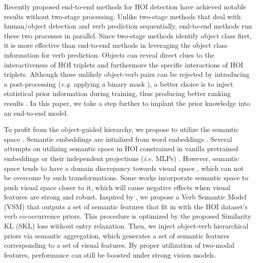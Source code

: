 \documentclass[letterpaper]{article} \usepackage{aaai22}  \usepackage{times}  \usepackage{helvet}  \usepackage{courier}  \usepackage[hyphens]{url}  \usepackage{graphicx} \urlstyle{rm} \def\UrlFont{\rm}  \usepackage{natbib}  \usepackage{caption} \DeclareCaptionStyle{ruled}{labelfont=normalfont,labelsep=colon,strut=off} \frenchspacing  \setlength{\pdfpagewidth}{8.5in}  \setlength{\pdfpageheight}{11in}  \usepackage{algorithm}
\begin{document}
Recently proposed end-to-end methods \cite{liao2020ppdm,kim2021hotr,tamura2021qpic} for HOI detection have achieved notable results without two-stage processing. Unlike two-stage methods that deal with human/object detection and verb prediction sequentially, end-to-end methods run these two processes in parallel. Since two-stage methods identify object class first, it is more effective than end-to-end methods in leveraging the object class information for verb prediction. Objects can reveal direct clues to the interactiveness of HOI triplets \cite{li2019interactiveness} and furthermore the specific interactions of HOI triplets. Although those unlikely object-verb pairs can be rejected by introducing a post-processing (\textit{e.g.} applying a binary mask \cite{tamura2021qpic}), a better choice is to inject statistical prior information during training, thus producing better ranking results \cite{chen2019KERN}. In this paper, we take a step further to implant the prior knowledge into an end-to-end model.












To profit from the object-guided hierarchy, we propose to utilize the semantic space \cite{rahman2020anyshot,xu2019HOIwithknowledge}. Semantic embeddings are intialized from word embeddings \cite{pennington2014glove,mikolov2013word2vec}. Several attempts on utilizing semantic space in HOI constrained in vanilla pretrained embeddings or their independent projections (\textit{i.e.} MLPs) \cite{zhong2020polysemy,gao2020DRG,bansal2020functionalgeneralization,peyre2019HOIwithanalogy}. However, semantic space tends to have a domain discrepancy towards visual space \cite{zhu2021semanticrelation}, which can not be overcome by such transformations. Some works \cite{xu2019HOIwithknowledge,peyre2019HOIwithanalogy} incorporate semantic space to push visual space closer to it, which will cause negative effects when visual features are strong and robust. Inspired by \cite{wu2018nonparametric_instance,you2020multilabelMSE}, we propose a Verb Semantic Model (VSM) that outputs a set of semantic features that fit in with the HOI dataset's verb co-occurrence priors. This procedure is optimized by the proposed Similarity KL (SKL) loss without entry relaxation. Then, we inject object-verb hierarchical priors via semantic aggregation, which generates a set of semantic features corresponding to a set of visual features. By proper utilization of two-modal features, performance can still be boosted under strong vision models. 
\end{document}
